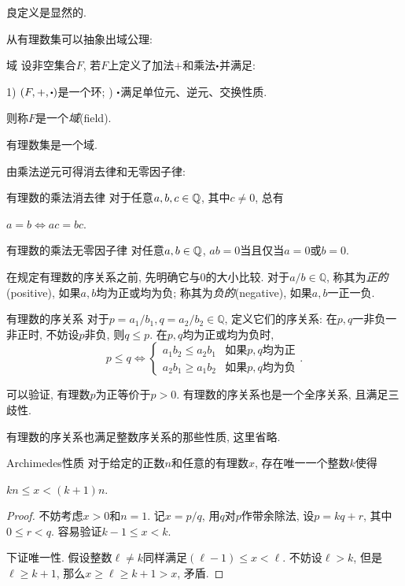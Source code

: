 良定义是显然的.

从有理数集可以抽象出域公理: 

\begin{axiom}{域}
	设非空集合$F$, 若$F$上定义了加法$+$和乘法$\bigcdot$并满足: 
	
	1) $(F,+,\bigcdot)$是一个环; ) $\bigcdot$满足单位元、逆元、交换性质. 

	\noindent
	则称$F$是一个\textit{域}(field).
\end{axiom}

有理数集是一个域.

由乘法逆元可得消去律和无零因子律: 

\begin{proposition}{有理数的乘法消去律}
	对于任意$a, b, c \in \mathbb{Q}$, 其中$c \neq 0$, 总有
	\begin{center}
		$a=b \Leftrightarrow ac=bc.$
	\end{center}
\end{proposition}

\begin{corollary}{有理数的乘法无零因子律}
	对任意$a, b \in \mathbb{Q}$, $ab=0$当且仅当$a=0$或$b=0$.
\end{corollary}

在规定有理数的序关系之前, 先明确它与$0$的大小比较. 对于$a/b \in \mathbb{Q}$, 称其为\textit{正的}(positive), 如果$a, b$均为正或均为负; 称其为\textit{负的}(negative), 如果$a, b$一正一负. 

\begin{definition}{有理数的序关系}
	对于$p=a_1/b_1, q=a_2/b_2 \in \mathbb{Q}$, 定义它们的序关系: 在$p, q$一非负一非正时, 不妨设$p$非负, 则$q \leq p$. 在$p, q$均为正或均为负时, 
	$$p \leq q \Leftrightarrow \begin{cases}
		a_1b_2 \leq a_2b_1 & \textit{如果$p, q$均为正} \\
		a_2b_1 \geq a_1b_2 & \textit{如果$p, q$均为负}
	\end{cases}.$$
\end{definition}

可以验证, 有理数$p$为正等价于$p>0$. 有理数的序关系也是一个全序关系, 且满足三歧性.

有理数的序关系也满足整数序关系的那些性质, 这里省略.

\begin{theorem}{Archimedes性质}
	对于给定的正数$n$和任意的有理数$x$, 存在唯一一个整数$k$使得
	\begin{center}
		$kn \leq x < (k+1)n.$
	\end{center}
\end{theorem}
\begin{proof}
	不妨考虑$x>0$和$n=1$. 记$x=p/q$, 用$q$对$p$作带余除法, 设$p=kq+r$, 其中$0 \leq r <q$. 容易验证$k-1 \leq x < k$. 
	
	下证唯一性. 假设整数$\ell \neq k$同样满足$(\ell -1) \leq x < \ell$. 不妨设$\ell >k$, 但是$\ell \geq k+1$, 那么$x \geq \ell \geq k+1 >x$, 矛盾. 
\end{proof}

